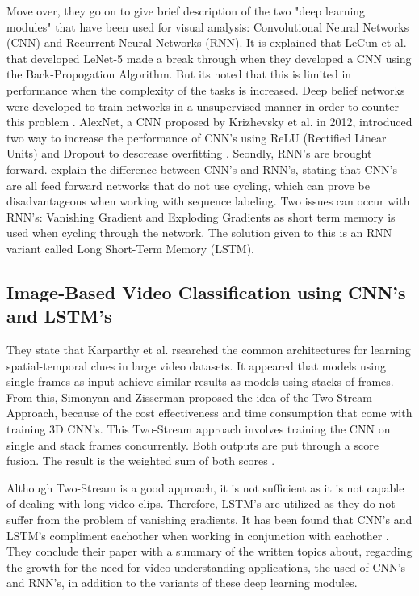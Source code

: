 Move over, they go on to give brief description of the two "deep learning modules" that have been used for visual analysis: Convolutional Neural Networks (CNN) and Recurrent Neural Networks (RNN). It is explained that LeCun et al. that developed LeNet-5 made a break through when they developed a CNN using the Back-Propogation Algorithm. But its noted that this is limited in performance when the complexity of the tasks is increased. Deep belief networks were developed to train networks in a unsupervised manner in order to counter this problem \citep{Wu}. AlexNet, a CNN proposed by Krizhevsky et al. in 2012, introduced two way to increase the performance of CNN's using ReLU (Rectified Linear Units) and Dropout to descrease overfitting \citep{Wu}. Seondly, RNN's are brought forward. \citeauthor{Wu} explain the difference between CNN's and RNN's, stating that CNN's are all feed forward networks that do not use cycling, which can prove be disadvantageous when working with sequence labeling. Two issues can occur with RNN's: Vanishing Gradient and Exploding Gradients as short term memory is used when cycling through the network. The solution given to this is an RNN variant called Long Short-Term Memory (LSTM). \\
\subsection*{Image-Based Video Classiﬁcation using CNN's and LSTM's}
They state that  Karparthy et al. rsearched the common architectures for learning spatial-temporal clues in large video datasets. It appeared that models using single frames as input achieve similar results as models using stacks of frames. From this, Simonyan and Zisserman proposed the idea of the Two-Stream Approach, because of the cost effectiveness and time consumption that come with training 3D CNN's. This Two-Stream approach involves training the CNN on single and stack frames concurrently. Both outputs are put through a score fusion. The result is the weighted sum of both scores \citep{Wu}. 

Although Two-Stream is a good approach, it is not sufficient as it is not capable of dealing with long video clips. Therefore, LSTM's are utilized as they do not suffer from the problem of vanishing gradients. It has been found that CNN's and LSTM's compliment eachother when working in conjunction with eachother \citep{Wu}. They conclude their paper with a summary of the written topics about, regarding the growth for the need for video understanding applications, the used of CNN's and RNN's, in addition to the variants of these deep learning modules. 


